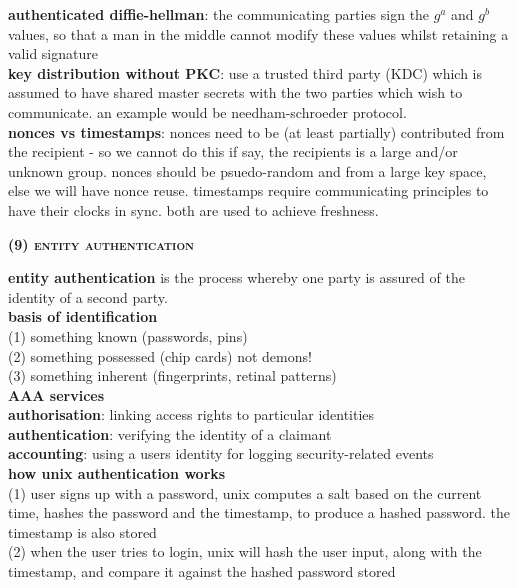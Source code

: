 \documentclass[a4paper]{article}
\begin{document}
\begin{multicols}{2}
\begin{framed}
	\noindent
	\textbf{authenticated diffie-hellman}: the communicating parties sign the $g^a$ and $g^b$ values, so that a man in the middle cannot modify these values whilst retaining a valid signature\\
	
	\noindent
	\textbf{key distribution without PKC}: use a trusted third party (KDC) which is assumed to have shared master secrets with the two parties which wish to communicate. an example would be needham-schroeder protocol.\\
	
	\noindent
	\textbf{nonces vs timestamps}: nonces need to be (at least partially) contributed from the recipient - so we cannot do this if say, the recipients is a large and/or unknown group. nonces should be psuedo-random and from a large key space, else we will have nonce reuse. timestamps require communicating principles to have their clocks in sync. both are used to achieve freshness.
\end{framed}

\newpage

\begin{framed}
	\begin{center}
		\textbf{\textsc{(9) entity authentication}}
	\end{center}
	
	\noindent
	\textbf{entity authentication} is the process whereby one party is assured of the identity of a second party.\\
	
	\noindent
	\textbf{basis of identification}\\
	(1) something known (passwords, pins)\\
	(2) something possessed (chip cards) not demons!\\
	(3) something inherent (fingerprints, retinal patterns)\\
	
	\noindent
	\textbf{AAA services}\\
	\textbf{authorisation}: linking access rights to particular identities\\
	\textbf{authentication}: verifying the identity of a claimant\\
	\textbf{accounting}: using a users identity for logging security-related events\\
	
	\noindent
	\textbf{how unix authentication works}\\
	(1) user signs up with a password, unix computes a salt based on the current time, hashes the password and the timestamp, to produce a hashed password. the timestamp is also stored\\
	(2) when the user tries to login, unix will hash the user input, along with the timestamp, and compare it against the hashed password stored\\
	

\end{framed}
\end{multicols}
\end{document}
